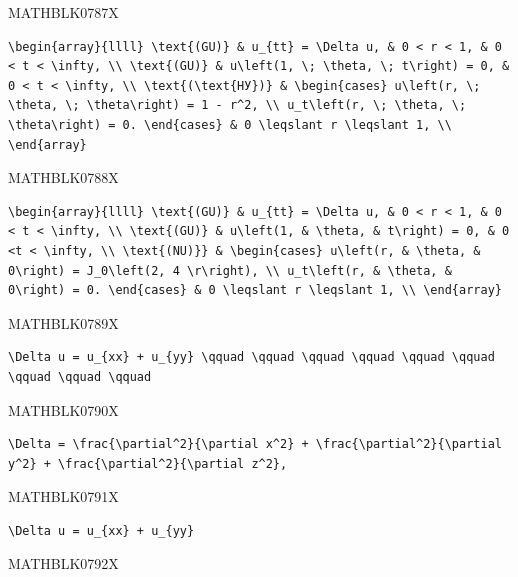 \documentclass[
  ukrainian,
]{article}
\begin{document}
MATHBLK0787X

\begin{verbatim}
\begin{array}{llll} \text{(GU)} & u_{tt} = \Delta u, & 0 < r < 1, & 0 < t < \infty, \\ \text{(GU)} & u\left(1, \; \theta, \; t\right) = 0, & 0 < t < \infty, \\ \text{(\text{НУ})} & \begin{cases} u\left(r, \; \theta, \; \theta\right) = 1 - r^2, \\ u_t\left(r, \; \theta, \; \theta\right) = 0. \end{cases} & 0 \leqslant r \leqslant 1, \\ \end{array}
\end{verbatim}

MATHBLK0788X

\begin{verbatim}
\begin{array}{llll} \text{(GU)} & u_{tt} = \Delta u, & 0 < r < 1, & 0 < t < \infty, \\ \text{(GU)} & u\left(1, & \theta, & t\right) = 0, & 0 <t < \infty, \\ \text{(NU)}} & \begin{cases} u\left(r, & \theta, & 0\right) = J_0\left(2, 4 \r\right), \\ u_t\left(r, & \theta, & 0\right) = 0. \end{cases} & 0 \leqslant r \leqslant 1, \\ \end{array}
\end{verbatim}

MATHBLK0789X

\begin{verbatim}
\Delta u = u_{xx} + u_{yy} \qquad \qquad \qquad \qquad \qquad \qquad \qquad \qquad \qquad
\end{verbatim}

MATHBLK0790X

\begin{verbatim}
\Delta = \frac{\partial^2}{\partial x^2} + \frac{\partial^2}{\partial y^2} + \frac{\partial^2}{\partial z^2},
\end{verbatim}

MATHBLK0791X

\begin{verbatim}
\Delta u = u_{xx} + u_{yy}
\end{verbatim}

MATHBLK0792X
\end{document}
